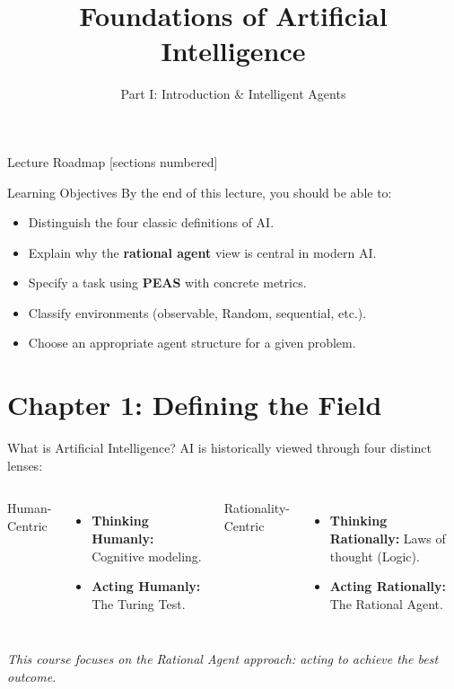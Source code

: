 \documentclass[10pt]{beamer}
\title{Foundations of Artificial Intelligence}
\subtitle{Part I: Introduction \& Intelligent Agents}
\institute{Department of Computer Science}
\date{}
\begin{document}
\maketitle

\begin{frame}{Lecture Roadmap}
    [sections numbered]
    \tableofcontents[hideallsubsections]
\end{frame}

\begin{frame}{Learning Objectives}
    By the end of this lecture, you should be able to:
    \begin{itemize}
        \item Distinguish the four classic definitions of AI.
        \item Explain why the \textbf{rational agent} view is central in modern AI.
        \item Specify a task using \textbf{PEAS} with concrete metrics.
        \item Classify environments (observable, Random, sequential, etc.).
        \item Choose an appropriate agent structure for a given problem.
    \end{itemize}
\end{frame}

\section{Chapter 1: Defining the Field}

\begin{frame}{What is Artificial Intelligence?}
    AI is historically viewed through four distinct lenses:
    \vspace{0.4cm}
    \begin{columns}[T,onlytextwidth]
            \alert{Human-Centric}
            \begin{itemize}
                \item \textbf{Thinking Humanly:} Cognitive modeling.
                \item \textbf{Acting Humanly:} The Turing Test.
            \end{itemize}
            \alert{Rationality-Centric}
            \begin{itemize}
                \item \textbf{Thinking Rationally:} Laws of thought (Logic).
                \item \textbf{Acting Rationally:} The Rational Agent.
            \end{itemize}
    \end{columns}
    \vspace{0.5cm}
    \textit{This course focuses on the Rational Agent approach: acting to achieve the best outcome.}
\end{frame}
\end{document}
